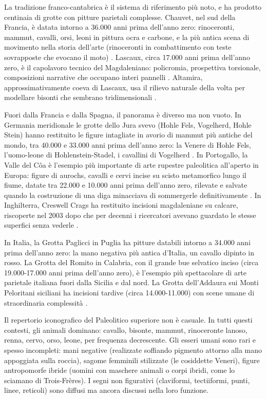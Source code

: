 La tradizione franco-cantabrica è il sistema di riferimento più noto, e ha prodotto centinaia di grotte con pitture parietali complesse. Chauvet, nel sud della Francia, è datata intorno a 36.000 anni prima dell'anno zero: rinoceronti, mammut, cavalli, orsi, leoni in pittura ocra e carbone, e la più antica scena di movimento nella storia dell'arte (rinoceronti in combattimento con teste sovrapposte che evocano il moto) \citep{chauvet1995, clottes2010}. Lascaux, circa 17.000 anni prima dell'anno zero, è il capolavoro tecnico del Magdaleniano: policromia, prospettiva torsionale, composizioni narrative che occupano interi pannelli \citep{leroi_gourhan1965}. Altamira, approssimativamente coeva di Lascaux, usa il rilievo naturale della volta per modellare bisonti che sembrano tridimensionali \citep{leroi_gourhan1965}.

Fuori dalla Francia e dalla Spagna, il panorama è diverso ma non vuoto. In Germania meridionale le grotte dello Jura svevo (Hohle Fels, Vogelherd, Hohle Stein) hanno restituito le figure intagliate in avorio di mammut più antiche del mondo, tra 40.000 e 33.000 anni prima dell'anno zero: la Venere di Hohle Fels, l'uomo-leone di Hohlenstein-Stadel, i cavallini di Vogelherd \citep{conard2009}. In Portogallo, la Valle del Côa è l'esempio più importante di arte rupestre paleolitica all'aperto in Europa: figure di aurochs, cavalli e cervi incise su scisto metamorfico lungo il fiume, datate tra 22.000 e 10.000 anni prima dell'anno zero, rilevate e salvate quando la costruzione di una diga minacciava di sommergerle definitivamente \citep{zilhao1995}. In Inghilterra, Creswell Crags ha restituito incisioni magdaleniane su calcare, riscoperte nel 2003 dopo che per decenni i ricercatori avevano guardato le stesse superfici senza vederle \citep{pettitt2007}.

In Italia, la Grotta Paglicci in Puglia ha pitture databili intorno a 34.000 anni prima dell'anno zero: la mano negativa più antica d'Italia, un cavallo dipinto in rosso. La Grotta del Romito in Calabria, con il grande bue selvatico inciso (circa 19.000-17.000 anni prima dell'anno zero), è l'esempio più spettacolare di arte parietale italiana fuori dalla Sicilia e dal nord. La Grotta dell'Addaura sui Monti Peloritani siciliani ha incisioni tardive (circa 14.000-11.000) con scene umane di straordinaria complessità \citep{graziosi1975}.

Il repertorio iconografico del Paleolitico superiore non è casuale. In tutti questi contesti, gli animali dominano: cavallo, bisonte, mammut, rinoceronte lanoso, renna, cervo, orso, leone, per frequenza decrescente. Gli esseri umani sono rari e spesso incompleti: mani negative (realizzate soffiando pigmento attorno alla mano appoggiata sulla roccia), sagome femminili stilizzate (le cosiddette Veneri), figure antropomorfe ibride (uomini con maschere animali o corpi ibridi, come lo sciamano di Trois-Frères). I segni non figurativi (claviformi, tectiiformi, punti, linee, reticoli) sono diffusi ma ancora discussi nella loro funzione.

